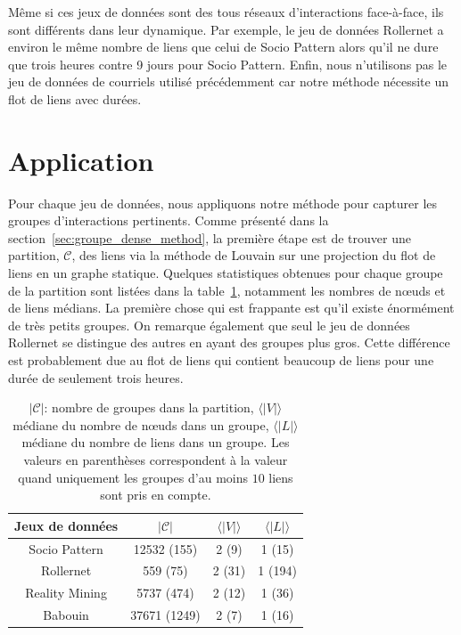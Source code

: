 Même si ces jeux de données sont des tous réseaux d'interactions face-à-face, ils sont différents dans leur dynamique.
Par exemple, le jeu de données Rollernet a environ le même nombre de liens que celui de Socio Pattern alors qu'il ne dure que trois heures contre 9 jours pour Socio Pattern.
Enfin, nous n'utilisons pas le jeu de données de courriels utilisé précédemment car notre méthode nécessite un flot de liens avec durées.



\section{Application}
\label{sec:groupe_dense_result}

Pour chaque jeu de données, nous appliquons notre méthode pour capturer les groupes d'interactions pertinents.
Comme présenté dans la section~\ref{sec:groupe_dense_method}, la première étape est de trouver une partition, $\mathcal{C}$, des liens via la méthode de Louvain sur une projection du flot de liens en un graphe statique.
Quelques statistiques obtenues pour chaque groupe de la partition sont listées dans la table~\ref{tab:partition_spec_gd}, notamment les nombres de n\oe{}uds et de liens médians.
La première chose qui est frappante est qu'il existe énormément de très petits groupes.
On remarque également que seul le jeu de données Rollernet se distingue des autres en ayant des groupes plus gros.
Cette différence est probablement due au flot de liens qui contient beaucoup de liens pour une durée de seulement trois heures.

\begin{table}
\centering
\begin{tabular}{|c|c|c|c|}
\hline \rule[-1ex]{0pt}{3.5ex}
Jeux de données & $|\mathcal{C}|$ & $\langle|V|\rangle$ & $\langle|L|\rangle$ \\
\hline
Socio Pattern & 12532 (155) & 2 (9) & 1 (15)\\
Rollernet& 559 (75) & 2 (31) & 1 (194)\\
Reality Mining & 5737 (474) & 2 (12) & 1 (36)\\
Babouin & 37671 (1249) & 2 (7) & 1 (16)\\
\hline
\end{tabular}
\caption{$|\mathcal{C}|$: nombre de groupes dans la partition, $\langle|V|\rangle$ médiane du nombre de n\oe{}uds dans un groupe, $\langle|L|\rangle$ médiane du nombre de liens dans un groupe.
Les valeurs en parenthèses correspondent à la valeur quand uniquement les groupes d'au moins $10$ liens sont pris en compte.}
\label{tab:partition_spec_gd} %
\end{table}



